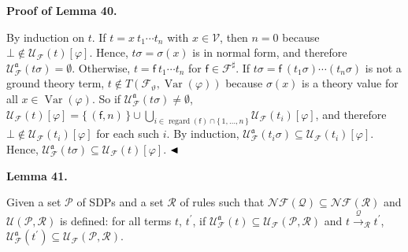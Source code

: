 \documentclass[10pt,a4paper]{amsart}
\begin{document}
\par\medskip\noindent\textbf{Proof of Lemma 40.}\par
 
 
By induction on $t$. If $t={x}\ {{t}_{1}\cdots{t}_{n}}$ with $x\in\mathcal{V}$, then $n=0$ because $\bot\notin\mathcal{U}_{\mathcal{F}}(t)[\varphi]$. Hence, $t\sigma=\sigma(x)$ is in normal form, and therefore $\mathcal{U}_{\mathcal{F}}^{\mathfrak{a}}(t\sigma)=\emptyset$. Otherwise, $t={\mathsf{f}}\ {{t}_{1}\cdots{t}_{n}}$ for $\mathsf{f}\in\mathcal{F}^{\sharp}$. If $t\sigma={\mathsf{f}}\ {(t_{1}\sigma)\cdots(t_{n}\sigma)}$ is not a ground theory term, $t\notin T({\mathcal{F}}_{\vartheta},\operatorname{Var}(\varphi))$ because $\sigma(x)$ is a theory value for all $x\in\operatorname{Var}(\varphi)$. So if $\mathcal{U}_{\mathcal{F}}^{\mathfrak{a}}(t\sigma)\neq\emptyset$, $\mathcal{U}_{\mathcal{F}}(t)[\varphi]=\{\,(\mathsf{f},n)\,\}\cup\bigcup_{i\in\operatorname{regard}(\mathsf{f})\cap\{\,1,\ldots,n\,\}}\mathcal{U}_{\mathcal{F}}(t_{i})[\varphi]$, and therefore $\bot\notin\mathcal{U}_{\mathcal{F}}(t_{i})[\varphi]$ for each such $i$. By induction, $\mathcal{U}_{\mathcal{F}}^{\mathfrak{a}}(t_{i}\sigma)\subseteq\mathcal{U}_{\mathcal{F}}(t_{i})[\varphi]$. Hence, $\mathcal{U}_{\mathcal{F}}^{\mathfrak{a}}(t\sigma)\subseteq\mathcal{U}_{\mathcal{F}}(t)[\varphi]$. $\hfill\blacktriangleleft$\par
 
 
 
\par\medskip\noindent\textbf{Lemma 41.}\par
 
 
Given a set $\mathcal{P}$ of SDPs and a set $\mathcal{R}$ of rules such that $\mathcal{N}\!\mathcal{F}(\mathcal{Q})\subseteq\mathcal{N}\!\mathcal{F}(\mathcal{R})$ and $\mathcal{U}(\mathcal{P},\mathcal{R})$ is defined: for all terms $t$, $t^{\prime}$, if $\mathcal{U}_{\mathcal{F}}^{\mathfrak{a}}(t)\subseteq\mathcal{U}_{\mathcal{F}}(\mathcal{P},\mathcal{R})$ and $t\xrightarrow{\scriptscriptstyle\mathcal{Q}}_{\mathcal{R}}t^{\prime}$, $\mathcal{U}_{\mathcal{F}}^{\mathfrak{a}}(t^{\prime})\subseteq\mathcal{U}_{\mathcal{F}}(\mathcal{P},\mathcal{R})$.\par
 
 
 
\end{document}
